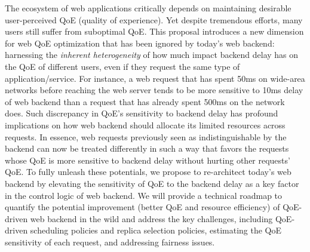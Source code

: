 The ecosystem of web applications critically depends on maintaining desirable user-perceived QoE (quality of experience).
Yet despite tremendous efforts,
many users still suffer from suboptimal QoE.
This proposal introduces a new dimension for web QoE optimization that has been ignored by today's web backend: harnessing the {\em inherent heterogeneity} of how much impact backend delay has on the QoE of different users, even if they request the same type of application/service.
For instance, a web request that has spent 50ms on wide-area networks before reaching the web server tends to be more sensitive to 10ms delay of web backend than a request that has already spent 500ms on the network does. 
Such discrepancy in QoE's sensitivity to backend delay has profound implications on how web backend should allocate its limited resources across requests.
In essence, web requests previously seen as indistinguishable by the backend can now be treated differently in such a way that favors the requests whose QoE is more sensitive to backend delay without hurting other requests' QoE. 
To fully unleash these potentials, we propose to re-architect today's web backend by elevating the sensitivity of QoE to the backend delay as a key factor in the control logic of web backend.
We will provide a technical roadmap to quantify the potential improvement (better QoE and resource efficiency) of QoE-driven web backend in the wild and address the key challenges, including QoE-driven scheduling policies and replica selection policies, estimating the QoE sensitivity of each request, and addressing fairness issues.


